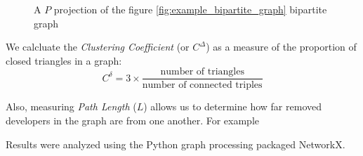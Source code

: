 \documentclass{proc}
\begin{document}
\begin{figure}
\label{fig:example_bipartite_projection_graph}
\centering
{}
\caption{A $P$ projection of the figure \ref{fig:example_bipartite_graph} bipartite graph}
\end{figure}


We calcluate the \textit{Clustering Coefficient} (or $C^\Delta$) as a measure of the proportion of closed triangles in a graph\cite{newman2003structure}:
\[C^\delta = 3 \times \frac{\text{number of triangles}}
                    {\text{number of connected triples}}\]

Also, measuring \textit{Path Length} ($L$) allows us to determine how far removed developers in the graph are from one another. For example 

Results were analyzed using the Python graph processing packaged NetworkX\cite{hagberg-2008-exploring}.
\end{document}
